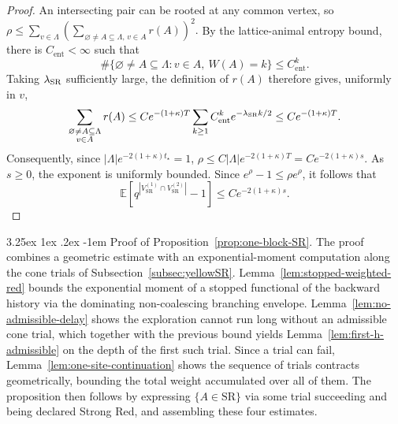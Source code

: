 \documentclass[letterpaper,11pt,reqno]{amsart}
\makeatletter
\theoremstyle{definition}
\renewcommand\paragraph{\@startsection{paragraph}{4}{\z@}%
  {3.25ex \@plus1ex \@minus.2ex}%
  {-1em}%
  {\normalfont\normalsize\bfseries}}
\makeatother
\begin{document}
\begin{proof}
An intersecting pair can be rooted at any common vertex, so $\rho
\le
\sum_{v\in\Lambda}
(
\sum_{{\varnothing\ne A\subseteq\Lambda,\,v\in A}}r(A)
)^2.$
By the lattice-animal entropy bound, there is
\(C_{\mathrm{ent}}<\infty\) such that
\[
\#\{\varnothing\ne A\subseteq\Lambda:v\in A,\ W(A)=k\}
\le C_{\mathrm{ent}}^k.
\]
Taking \(\lambda_{\rm SR}\) sufficiently large, the definition of \(r(A)\) therefore
gives, uniformly in \(v\),
\[
\sum_{\substack{\varnothing\ne A\subseteq\Lambda\\v\in A}}r(A)
\le
C e^{-(1+\kappa)T}
\sum_{k\ge1}C_{\mathrm{ent}}^ke^{-\lambda_{\rm SR} k/2}
\le
C e^{-(1+\kappa)T}.
\]
Consequently, since
\(|\Lambda|e^{-2(1+\kappa)t_\star}=1\),
$\rho
\le
C|\Lambda|e^{-2(1+\kappa)T}
=
C e^{-2(1+\kappa)s}.$
As \(s\ge0\), the exponent is uniformly bounded. Since
\(e^\rho-1\le\rho e^\rho\), it follows that
\[
\mathbb E\left[
q^{|V_{\mathrm{SR}}^{(1)}\cap V_{\mathrm{SR}}^{(2)}|}-1
\right]
\le
C e^{-2(1+\kappa)s}.
\]
\end{proof}




\paragraph{Proof of Proposition~\ref{prop:one-block-SR}.}
The proof combines a geometric estimate with an exponential-moment computation along the cone trials of Subsection~\ref{subsec:yellowSR}. Lemma~\ref{lem:stopped-weighted-red} bounds the exponential moment of a stopped functional of the backward history via the dominating non-coalescing branching envelope. Lemma~\ref{lem:no-admissible-delay} shows the exploration cannot run long without an admissible cone trial, which together with the previous bound yields
Lemma~\ref{lem:first-h-admissible} on the depth of the first such trial. Since a trial can fail,
Lemma~\ref{lem:one-site-continuation} shows the sequence of trials contracts geometrically, bounding the total weight accumulated over all of them. The proposition then follows by expressing \(\{A\in\mathrm{SR}\}\) via some trial succeeding and being declared Strong Red, and assembling these four estimates.
\end{document}
